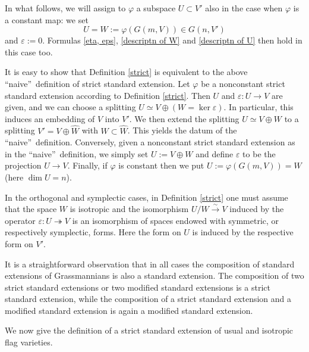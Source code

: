 \documentclass[12pt]{amsart}
\renewcommand{\phi}{\varphi}
\theoremstyle{definition}
\begin{document}
In what follows, we will assign to $\varphi$ a subspace $U\subset V'$ also 
in the case when $\phi$ is a constant map: we set 
$$
U=W:=\phi(G(m,V))\in G(n,V')
$$ 
and $\varepsilon:=0$. Formulas \eqref{eta, eps}, \eqref{descriptn  of 
W} and \eqref{descriptn  of U} then hold in this case too. 

It is easy to show that Definition 
\ref{strict} is equivalent to the above 
\textquotedblleft naive\textquotedblright \ definition of 
strict standard extension. Let $\phi$ be a nonconstant strict 
standard extension according to Definition \ref{strict}.  
Then $U$ and $\varepsilon:U\to V$ are given, and we can choose 
a splitting $U\simeq V\oplus(W=\ker
\varepsilon)$. In particular, this induces an embedding of $V$ 
into $V'$. We then extend the splitting $U\simeq V\oplus W$ to
a splitting $V'=V\oplus\widehat{W}$ with $W\subset
\widehat{W}$. This yields the datum of the \textquotedblleft naive\textquotedblright \ definition.
Conversely, given a nonconstant strict standard extension as
in the \textquotedblleft naive\textquotedblright \ definition, we simply set $U:=V\oplus W$ and 
define $\varepsilon$ to be the projection $U\to V$. Finally, 
if $\phi$ is constant then we put $U:=\phi(G(m,V))=W$ (here $\dim U=n$). 

In the orthogonal and symplectic cases, in Definition 
\ref{strict} one must assume that the space $W$ is
isotropic and the isomorphism $U/W\xrightarrow{\sim}V$ induced 
by the operator $\varepsilon:U\twoheadrightarrow V$ is an
isomorphism of spaces endowed with symmetric, or respectively 
symplectic, forms. Here the form on $U$ is induced by the 
respective form on $V'$. 

It is a straightforward observation that in all cases the 
composition of standard extensions of Grassmannians is also a
standard extension. The composition of two strict standard 
extensions or two modified standard extensions is a strict
standard extension, while the composition of a strict standard 
extension and a modified standard extension is again a 
modified standard extension.

We now give the definition of a strict standard extension of 
usual and isotropic flag varieties.
\end{document}
